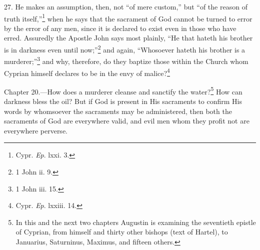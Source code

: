 27. He makes an assumption, then, not ``of mere custom,'' but ``of the reason of truth itself,''\footnote{\par  Cypr. \emph{Ep}. lxxi. 3.} when he says that the sacrament of God cannot be turned to error by the error of any men, since it is declared to exist even in those who have erred. Assuredly the Apostle John says most plainly, ``He that hateth his brother is in darkness even until now;''\footnote{\par  1 John ii. 9.} and again, ``Whosoever hateth his brother is a murderer;''\footnote{\par  1 John iii. 15.} and why, therefore, do they baptize those within the Church whom Cyprian himself declares to be in the envy of malice?\footnote{\par  Cypr. \emph{Ep}. lxxiii. 14.}


Chapter 20.—How does a murderer cleanse and sanctify the water?\footnote{\par  In this and the next two chapters Augustin is examining the seventieth epistle of Cyprian, from himself and thirty other bishops (text of Hartel), to Januarius, Saturninus, Maximus, and fifteen others.} How can darkness bless the oil? But if God is present in His sacraments to confirm His words by whomsoever the sacraments may be administered, then both the sacraments of God are everywhere valid, and evil men whom they profit not are everywhere perverse.


